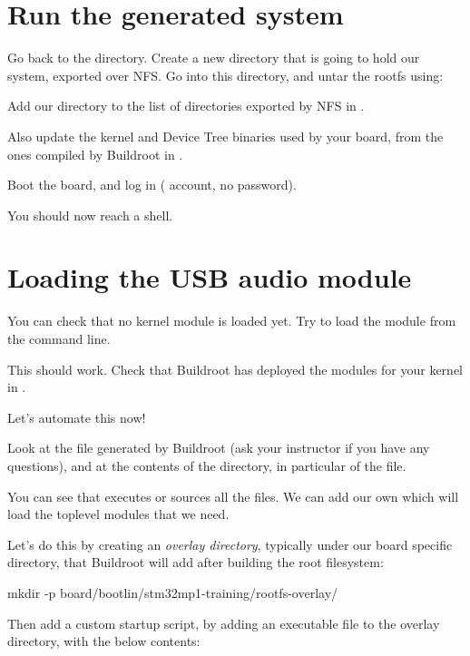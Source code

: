 \section{Run the generated system}

Go back to the  directory. Create
a new  directory that is going to hold our system,
exported over NFS. Go into this directory, and untar the rootfs using:


Add our  directory to the list of directories exported
by NFS in .

Also update the kernel and Device Tree binaries used by your board,
from the ones compiled by Buildroot in .

Boot the board, and log in ( account, no password).

You should now reach a shell.

\section{Loading the USB audio module}

You can check that no kernel module is loaded yet. Try to load the
 module from the command line.

This should work. Check that Buildroot has deployed the modules
for your kernel in .

Let's automate this now!

Look at the  file generated by Buildroot (ask your
instructor if you have any questions), and at the contents of the
 directory, in particular of the  file.

You can see that  executes or sources all the 
files. We can add our own which will load the toplevel modules that we
need.

Let's do this by creating an {\em overlay directory}, typically under
our board specific directory, that Buildroot will add after building the
root filesystem:

\begin{bashinput}
mkdir -p board/bootlin/stm32mp1-training/rootfs-overlay/
\end{bashinput}

Then add a custom startup script, by adding an 
executable file to the overlay directory, with the below contents:


